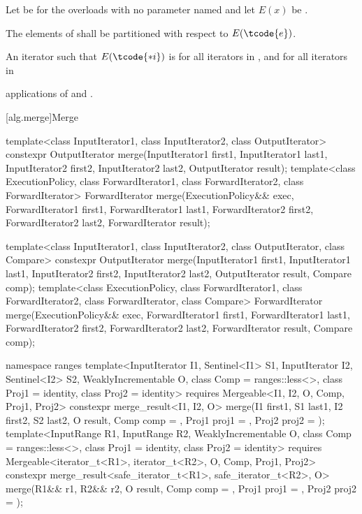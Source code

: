 \begin{itemdescr}
\pnum
Let  be 
for the overloads with no parameter named 
and let $E(x)$ be .

\pnum
\requires
The elements  of 
shall be partitioned with respect to $E(\tcode{e})$.

\pnum
\returns
An iterator 
such that $E(\tcode{*i})$ is 
for all iterators  in , and
 for all iterators  in 

\pnum
\complexity
{} applications
of  and .
\end{itemdescr}

[alg.merge]{Merge}

%
\begin{itemdecl}
template<class InputIterator1, class InputIterator2,
         class OutputIterator>
  constexpr OutputIterator
    merge(InputIterator1 first1, InputIterator1 last1,
          InputIterator2 first2, InputIterator2 last2,
          OutputIterator result);
template<class ExecutionPolicy, class ForwardIterator1, class ForwardIterator2,
         class ForwardIterator>
  ForwardIterator
    merge(ExecutionPolicy&& exec,
          ForwardIterator1 first1, ForwardIterator1 last1,
          ForwardIterator2 first2, ForwardIterator2 last2,
          ForwardIterator result);

template<class InputIterator1, class InputIterator2,
         class OutputIterator, class Compare>
  constexpr OutputIterator
    merge(InputIterator1 first1, InputIterator1 last1,
          InputIterator2 first2, InputIterator2 last2,
          OutputIterator result, Compare comp);
template<class ExecutionPolicy, class ForwardIterator1, class ForwardIterator2,
         class ForwardIterator, class Compare>
  ForwardIterator
    merge(ExecutionPolicy&& exec,
          ForwardIterator1 first1, ForwardIterator1 last1,
          ForwardIterator2 first2, ForwardIterator2 last2,
          ForwardIterator result, Compare comp);

namespace ranges {
  template<InputIterator I1, Sentinel<I1> S1, InputIterator I2, Sentinel<I2> S2,
           WeaklyIncrementable O, class Comp = ranges::less<>, class Proj1 = identity,
           class Proj2 = identity>
    requires Mergeable<I1, I2, O, Comp, Proj1, Proj2>
    constexpr merge_result<I1, I2, O>
      merge(I1 first1, S1 last1, I2 first2, S2 last2, O result,
            Comp comp = {}, Proj1 proj1 = {}, Proj2 proj2 = {});
  template<InputRange R1, InputRange R2, WeaklyIncrementable O, class Comp = ranges::less<>,
           class Proj1 = identity, class Proj2 = identity>
    requires Mergeable<iterator_t<R1>, iterator_t<R2>, O, Comp, Proj1, Proj2>
    constexpr merge_result<safe_iterator_t<R1>, safe_iterator_t<R2>, O>
      merge(R1&& r1, R2&& r2, O result,
            Comp comp = {}, Proj1 proj1 = {}, Proj2 proj2 = {});
}
\end{itemdecl}

